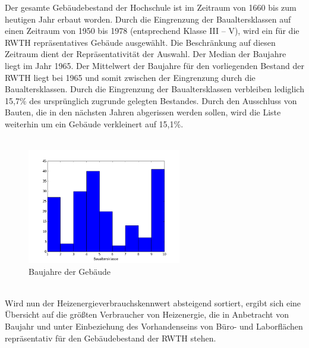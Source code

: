 Der gesamte Gebäudebestand der Hochschule ist im Zeitraum von 1660 bis zum heutigen Jahr erbaut worden. Durch die Eingrenzung der Baualtersklassen auf einen Zeitraum von 1950 bis 1978 (entsprechend Klasse III – V), wird ein für die RWTH repräsentatives Gebäude ausgewählt. Die Beschränkung auf diesen Zeitraum dient der Repräsentativität der Auswahl. Der Median der Baujahre liegt im Jahr 1965.  Der Mittelwert der Baujahre für den vorliegenden Bestand der RWTH liegt bei 1965 und somit zwischen der Eingrenzung durch die Baualtersklassen. Durch die Eingrenzung der Baualtersklassen verbleiben lediglich 15,7\% des ursprünglich zugrunde gelegten Bestandes. Durch den Ausschluss von Bauten, die in den nächsten Jahren abgerissen werden sollen, wird die Liste weiterhin um ein Gebäude verkleinert auf 15,1\%. \\
\\
\begin{figure}[htb]
	\centering
		\includegraphics[width=0.60\textwidth]{Pictures/BAK.png}
	\caption{Baujahre der Gebäude}
	\label{fig:Baujahre der Gebäude}
\end{figure}
\\

Wird nun der Heizenergieverbrauchskennwert absteigend sortiert, ergibt sich eine Übersicht auf die größten Verbraucher von Heizenergie, die in Anbetracht von Baujahr und unter Einbeziehung des Vorhandenseins von Büro- und Laborflächen repräsentativ für den Gebäudebestand der RWTH stehen.  \\



